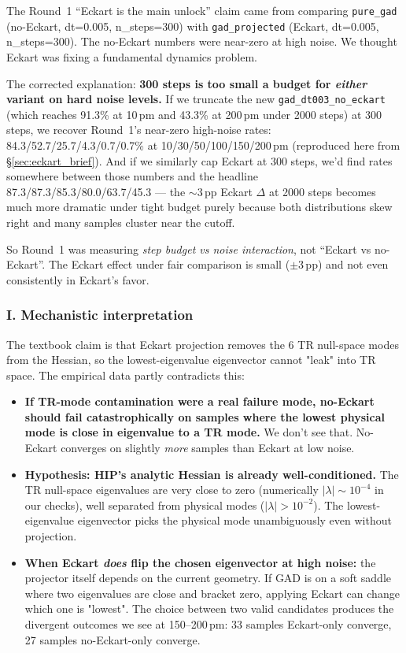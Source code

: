 \documentclass[11pt]{article}
\begin{document}
The Round~1 ``Eckart is the main unlock'' claim came from comparing
\texttt{pure\_gad} (no-Eckart, dt=0.005, n\_steps=300) with
\texttt{gad\_projected} (Eckart, dt=0.005, n\_steps=300). The
no-Eckart numbers were near-zero at high noise. We thought Eckart was
fixing a fundamental dynamics problem.

The corrected explanation: \textbf{300 steps is too small a budget for
\emph{either} variant on hard noise levels.} If we truncate the new
\texttt{gad\_dt003\_no\_eckart} (which reaches 91.3\% at 10\,pm and
43.3\% at 200\,pm under 2000 steps) at 300 steps, we recover Round~1's
near-zero high-noise rates: 84.3/52.7/25.7/4.3/0.7/0.7\% at 10/30/50/100/150/200\,pm
(reproduced here from \S\ref{sec:eckart_brief}). And if we similarly
cap Eckart at 300 steps, we'd find rates somewhere between those
numbers and the headline 87.3/87.3/85.3/80.0/63.7/45.3 --- the
$\sim$3\,pp Eckart $\Delta$ at 2000 steps becomes much more dramatic
under tight budget purely because both distributions skew right and
many samples cluster near the cutoff.

So Round~1 was measuring \emph{step budget vs noise interaction}, not
``Eckart vs no-Eckart''. The Eckart effect under fair comparison is
small ($\pm$3\,pp) and not even consistently in Eckart's favor.

\subsubsection*{I. Mechanistic interpretation}

The textbook claim is that Eckart projection removes the 6 TR null-space
modes from the Hessian, so the lowest-eigenvalue eigenvector cannot
"leak" into TR space. The empirical data partly contradicts this:

\begin{itemize}[nosep,leftmargin=1.5em]
\item \textbf{If TR-mode contamination were a real failure mode, no-Eckart
      should fail catastrophically on samples where the lowest physical
      mode is close in eigenvalue to a TR mode.} We don't see that.
      No-Eckart converges on slightly \emph{more} samples than Eckart
      at low noise.
\item \textbf{Hypothesis: HIP's analytic Hessian is already well-conditioned.}
      The TR null-space eigenvalues are very close to zero (numerically
      $|\lambda| \sim 10^{-4}$ in our checks), well separated from
      physical modes ($|\lambda| > 10^{-2}$). The lowest-eigenvalue
      eigenvector picks the physical mode unambiguously even without
      projection.
\item \textbf{When Eckart \emph{does} flip the chosen eigenvector at
      high noise:} the projector itself depends on the current geometry.
      If GAD is on a soft saddle where two eigenvalues are close and
      bracket zero, applying Eckart can change which one is "lowest".
      The choice between two valid candidates produces the divergent
      outcomes we see at 150--200\,pm: 33 samples Eckart-only converge,
      27 samples no-Eckart-only converge.
\end{itemize}
\end{document}
